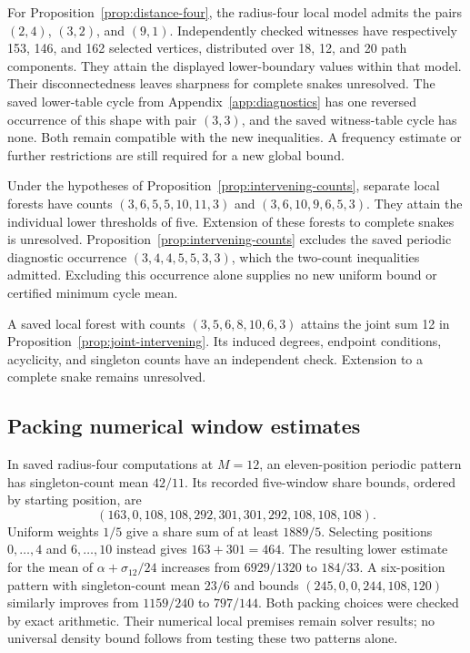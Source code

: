 \documentclass[11pt,a4paper]{article}
\theoremstyle{definition}
\theoremstyle{remark}
\begin{document}
For Proposition~\ref{prop:distance-four}, the radius-four local model admits the pairs $(2,4)$, $(3,2)$, and $(9,1)$. Independently checked witnesses have respectively 153, 146, and 162 selected vertices, distributed over 18, 12, and 20 path components. They attain the displayed lower-boundary values within that model. Their disconnectedness leaves sharpness for complete snakes unresolved. The saved lower-table cycle from Appendix~\ref{app:diagnostics} has one reversed occurrence of this shape with pair $(3,3)$, and the saved witness-table cycle has none. Both remain compatible with the new inequalities. A frequency estimate or further restrictions are still required for a new global bound.

Under the hypotheses of Proposition~\ref{prop:intervening-counts}, separate local forests have counts $(3,6,5,5,10,11,3)$ and $(3,6,10,9,6,5,3)$. They attain the individual lower thresholds of five. Extension of these forests to complete snakes is unresolved. Proposition~\ref{prop:intervening-counts} excludes the saved periodic diagnostic occurrence $(3,4,4,5,5,3,3)$, which the two-count inequalities admitted. Excluding this occurrence alone supplies no new uniform bound or certified minimum cycle mean.

A saved local forest with counts $(3,5,6,8,10,6,3)$ attains the joint sum 12 in Proposition~\ref{prop:joint-intervening}. Its induced degrees, endpoint conditions, acyclicity, and singleton counts have an independent check. Extension to a complete snake remains unresolved.

\subsection{Packing numerical window estimates}
In saved radius-four computations at $M=12$, an eleven-position periodic pattern has singleton-count mean $42/11$. Its recorded five-window share bounds, ordered by starting position, are
\[
(163,0,108,108,292,301,301,292,108,108,108).
\]
Uniform weights $1/5$ give a share sum of at least $1889/5$. Selecting positions $0,\ldots,4$ and $6,\ldots,10$ instead gives $163+301=464$. The resulting lower estimate for the mean of $\alpha+\sigma_{12}/24$ increases from $6929/1320$ to $184/33$. A six-position pattern with singleton-count mean $23/6$ and bounds $(245,0,0,244,108,120)$ similarly improves from $1159/240$ to $797/144$. Both packing choices were checked by exact arithmetic. Their numerical local premises remain solver results; no universal density bound follows from testing these two patterns alone.
\end{document}
